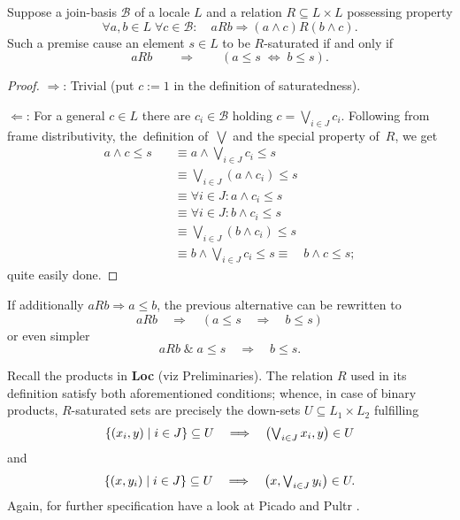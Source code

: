 \begin{lem}
  Suppose a join-basis $\mathcal{B}$ of a locale $L$ and a relation $R
  \subseteq L \times L$ possessing property
  \[
    \forall a, b\in L \; \forall c \in \mathcal{B}: \quad aRb \Rightarrow (a
    \wedge c)R(b \wedge c).
  \]
  Such a premise cause an element $s\in L$ to be $R$-saturated if and only if
  \[
    aRb \qquad \Rightarrow \qquad (a \leq s \; \Leftrightarrow \; b \leq s).
  \]
\end{lem}
\begin{proof}
  $\Rightarrow$: Trivial (put $c := 1$ in the definition of saturatedness).

  $\Leftarrow$: For a general $c\in L$ there are $c_i\in \mathcal{B}$ holding
  $c = \bigvee_{i\in J} c_i$.
  Following from frame distributivity, the~definition of~$\bigvee$ and the
  special property of~$R$, we get
  \begin{align*}
    a \wedge c \leq s \quad
    &\equiv a \wedge \bigvee_{i\in J} c_i \leq s \\
    &\equiv \bigvee_{i\in J} (a \wedge c_i) \leq s \\
    &\equiv \forall i\in J: a \wedge c_i \leq s \\
    &\equiv \forall i\in J: b \wedge c_i \leq s \\
    &\equiv \bigvee_{i\in J} (b \wedge c_i) \leq s \\
    &\equiv b \wedge \bigvee_{i\in J} c_i \leq s
    \equiv \quad b \wedge c \leq s;
  \end{align*}
  quite easily done.
\end{proof}

\begin{rem} \label{satur-def-eq}
  If additionally $aRb \Rightarrow a \leq b$, the previous alternative can be
  rewritten to
  \[
    aRb \quad \Rightarrow \quad (a \leq s \quad \Rightarrow \quad b \leq s)
  \]
  or even simpler
  \[
    aRb \; \& \; a \leq s \quad \Longrightarrow \quad b \leq s.
  \]

  Recall the products in {\bf Loc} (viz Preliminaries).
  The relation $R$ used in its definition satisfy both aforementioned
  conditions;
  whence, in case of binary products, $R$-saturated sets are precisely the
  down-sets $U \subseteq L_1 \times L_2$ fulfilling 
  \[
    \textstyle
    \{ (x_i, y) \mid i \in J \} \subseteq U \quad \Longrightarrow \quad
    \left(\bigvee_{i\in J} x_i, y\right)\in U
  \]
  and
  \[
    \textstyle
    \{ (x, y_i) \mid i \in J \} \subseteq U \quad \Longrightarrow \quad \left(x,
    \bigvee_{i\in J} y_i\right)\in U.
  \]
  Again, for further specification have a look at Picado and Pultr
  \cite{picado-pultr12}.
\end{rem}

